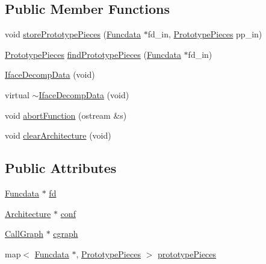 \subsection*{Public Member Functions}
\begin{DoxyCompactItemize}
\item 
void \mbox{\hyperlink{class_iface_decomp_data_abe1506740923a97939ace2445d351b45}{store\+Prototype\+Pieces}} (\mbox{\hyperlink{class_funcdata}{Funcdata}} $\ast$fd\+\_\+in, \mbox{\hyperlink{struct_prototype_pieces}{Prototype\+Pieces}} pp\+\_\+in)
\item 
\mbox{\hyperlink{struct_prototype_pieces}{Prototype\+Pieces}} \mbox{\hyperlink{class_iface_decomp_data_af70c37173793122de0725e227c5f84a8}{find\+Prototype\+Pieces}} (\mbox{\hyperlink{class_funcdata}{Funcdata}} $\ast$fd\+\_\+in)
\item 
\mbox{\hyperlink{class_iface_decomp_data_ad05817ffc163460e94cf21dbb481c805}{Iface\+Decomp\+Data}} (void)
\item 
virtual \mbox{\hyperlink{class_iface_decomp_data_a17c03dc736086ab551cfe1c31f6d5260}{$\sim$\+Iface\+Decomp\+Data}} (void)
\item 
void \mbox{\hyperlink{class_iface_decomp_data_aa1909a91f347f8925d2932da078b20bf}{abort\+Function}} (ostream \&s)
\item 
void \mbox{\hyperlink{class_iface_decomp_data_a23c95a500eccef410cbe4049b2d3cce3}{clear\+Architecture}} (void)
\end{DoxyCompactItemize}
\subsection*{Public Attributes}
\begin{DoxyCompactItemize}
\item 
\mbox{\hyperlink{class_funcdata}{Funcdata}} $\ast$ \mbox{\hyperlink{class_iface_decomp_data_a6448c8594d5fc954dd79f896f449e058}{fd}}
\item 
\mbox{\hyperlink{class_architecture}{Architecture}} $\ast$ \mbox{\hyperlink{class_iface_decomp_data_ade09ccf947ddb5fda8f76dc9260337ec}{conf}}
\item 
\mbox{\hyperlink{class_call_graph}{Call\+Graph}} $\ast$ \mbox{\hyperlink{class_iface_decomp_data_a89cdc94ddcd59bc2d70db51c0a4d5419}{cgraph}}
\item 
map$<$ \mbox{\hyperlink{class_funcdata}{Funcdata}} $\ast$, \mbox{\hyperlink{struct_prototype_pieces}{Prototype\+Pieces}} $>$ \mbox{\hyperlink{class_iface_decomp_data_ad29fbdde2fc92deabfb3eaeac2425d41}{prototype\+Pieces}}
\end{DoxyCompactItemize}


